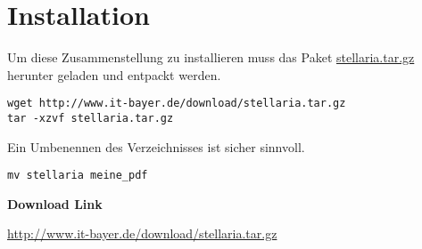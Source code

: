 \section{Installation}
\label{sec:installation}

Um diese Zusammenstellung zu installieren muss das Paket
\href{http://www.it-bayer.de/download/stellaria.tar.gz}{stellaria.tar.gz} 
herunter geladen und entpackt werden.

\begin{verbatim}
wget http://www.it-bayer.de/download/stellaria.tar.gz
tar -xzvf stellaria.tar.gz
\end{verbatim}

Ein Umbenennen des Verzeichnisses ist sicher sinnvoll.

\begin{verbatim}
mv stellaria meine_pdf
\end{verbatim}

\textbf{Download Link} 

\url{http://www.it-bayer.de/download/stellaria.tar.gz}
